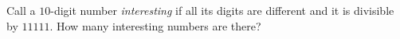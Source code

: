 Call a $10$-digit number \emph{interesting} if all its digits are different and it is divisible by $11111$. How many interesting numbers are there?
